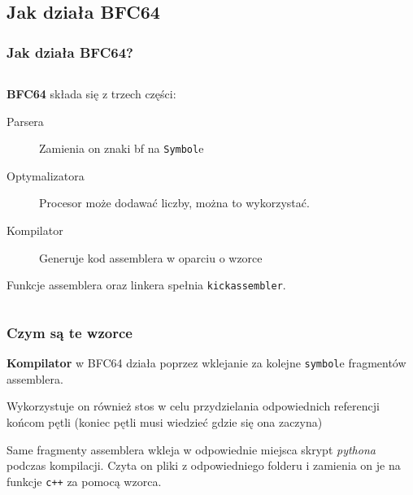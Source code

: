\documentclass[aspectratio=169]{beamer}
\begin{document}
\subsection{Jak działa BFC64}
\begin{frame}[fragile]
    \frametitle{Jak działa BFC64?}
    \begin{columns}
        \begin{column}{0.8\textwidth}
            \textbf{BFC64} składa się z trzech części:
            \begin{description}
                \item[Parsera] Zamienia on znaki bf na \texttt{Symbol}e \pause
                \item[Optymalizatora] Procesor może dodawać liczby, można to wykorzystać.\pause 
                \item[Kompilator] Generuje kod assemblera w oparciu o wzorce \pause
            \end{description}
            \pause
            Funkcje assemblera oraz linkera spełnia \texttt{kickassembler}.
        \end{column}
        \begin{column}{0.2\textwidth}
        \end{column}
    \end{columns}
\end{frame}
\begin{frame}
    \frametitle{Czym są te wzorce}
    \textbf{Kompilator} w BFC64 działa poprzez wklejanie za kolejne \texttt{symbol}e fragmentów assemblera.

    Wykorzystuje on również stos w celu przydzielania odpowiednich referencji końcom pętli (koniec pętli musi wiedzieć gdzie się ona zaczyna)
    \pause
    \vspace{5mm}

    Same fragmenty assemblera wkleja w odpowiednie miejsca skrypt \emph{pythona} podczas kompilacji. Czyta on pliki z odpowiedniego folderu i zamienia on je na funkcje \texttt{c++} za pomocą wzorca.
\end{frame}
\end{document}
